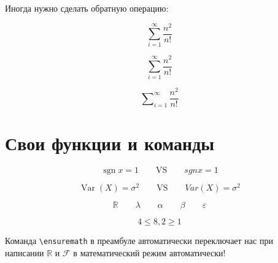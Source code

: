 \documentclass[12pt, a4paper]{article}
\DeclareMathOperator{\sgn}{sgn}
\DeclareMathOperator{\Var}{Var}
\def\R{\ensuremath{\mathbb{R}}} %
\def\F{\ensuremath{\mathcal{F}}{ }} %
\def \a{\alpha}
\def \b{\beta}
\def \la{\lambda}
\def \e{\varepsilon}
\begin{document}
Иногда нужно сделать обратную операцию:

\[\sum_{i=1}^{\infty} \frac{n^2}{n!} \]

\[\textstyle \sum_{i=1}^{\infty} \frac{n^2}{n!} \]

\[ \sum\nolimits_{i=1}^{\infty} \frac{n^2}{n!} \]








\section{Свои функции и команды}

\[\sgn  x = 1 \qquad \text{VS} \qquad sgn x = 1\]

\[\Var(X) = \sigma^2 \qquad \text{VS} \qquad Var(X) = \sigma^2\]

\[ \R \qquad \la \qquad \a \qquad \b \qquad \e \]

\[ 4 \le 8, 2 \ge 1\]

Команда \verb|\ensuremath| в преамбуле автоматически переключает нас при написании \R{} и \F в математический режим автоматически!
\end{document}

